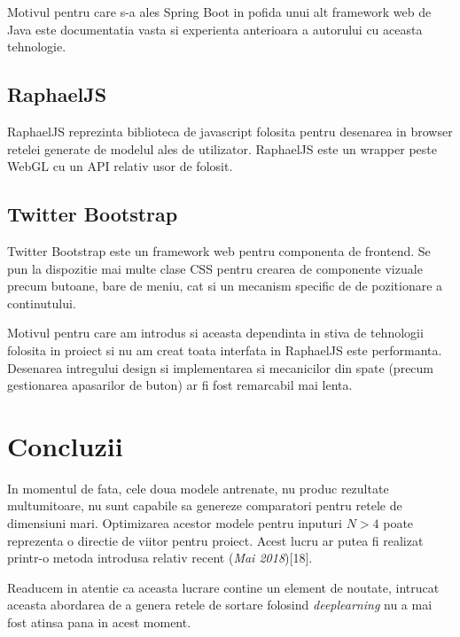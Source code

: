 \documentclass[12pt]{article}
\begin{document}
Motivul pentru care s-a ales Spring Boot in pofida unui alt framework web de Java este documentatia vasta si experienta anterioara a autorului cu aceasta tehnologie.

\subsection{RaphaelJS}

RaphaelJS reprezinta biblioteca de javascript folosita pentru desenarea in browser retelei generate de modelul ales de utilizator. RaphaelJS este un wrapper peste WebGL cu un API relativ usor de folosit.


\subsection{Twitter Bootstrap}

Twitter Bootstrap este un framework web pentru componenta de frontend. Se pun la dispozitie mai multe clase CSS pentru crearea de componente vizuale precum butoane, bare de meniu, cat si un mecanism specific de de pozitionare a continutului.

Motivul pentru care am introdus si aceasta dependinta in stiva de tehnologii folosita in proiect si nu am creat toata interfata in RaphaelJS este performanta. Desenarea intregului design si implementarea si mecanicilor din spate (precum gestionarea apasarilor de buton) ar fi fost remarcabil mai lenta.

\pagebreak

\section{Concluzii}

 In momentul de fata, cele doua modele antrenate, nu produc rezultate multumitoare, nu sunt capabile sa genereze comparatori pentru retele de dimensiuni mari. Optimizarea acestor modele pentru inputuri $N>4$ poate reprezenta o directie de viitor pentru proiect. Acest lucru ar putea fi realizat printr-o metoda introdusa relativ recent (\textit{Mai 2018})[18].

Readucem in atentie ca aceasta lucrare contine un element de noutate, intrucat aceasta abordarea de a genera retele de sortare folosind \textit{deeplearning} nu a mai fost atinsa pana in acest moment. 
  
 
\end{document}
